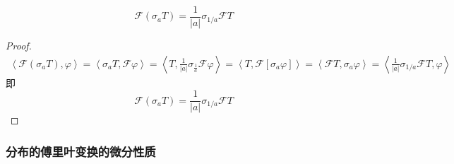 \begin{theorem}[分布的傅里叶变换的尺度变换]
    $$\mathcal{F}(\sigma_a T)=\frac{1}{|a|}\sigma_{1/a}\mathcal{F}T$$
\end{theorem}
\begin{proof}
    \begin{align*}
    \left\langle\mathcal{F}(\sigma_a T),\varphi\right\rangle =\left\langle \sigma_a T,\mathcal{F}\varphi\right\rangle=\left\langle T,\frac{1}{|a|}\sigma_{\frac{1}{a}}\mathcal{F}\varphi\right\rangle=\left\langle T,\mathcal{F}[\sigma_a \varphi]\right\rangle=\left\langle \mathcal{F}T,\sigma_a\varphi\right\rangle=\left\langle \frac{1}{|a|}\sigma_{1/a}\mathcal{F}T,\varphi\right\rangle
\end{align*}
即\[\mathcal{F}(\sigma_a T)=\frac{1}{|a|}\sigma_{1/a}\mathcal{F}T\]
\end{proof}

\subsubsection{分布的傅里叶变换的微分性质}

